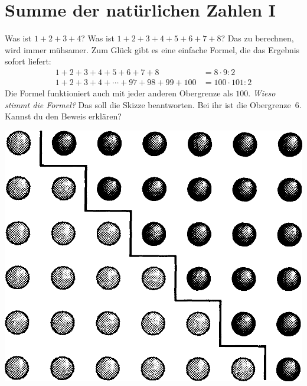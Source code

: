 \documentclass{../zirkelblatt}
\begin{document}
\section*{Summe der natürlichen Zahlen I}
Was ist $1 + 2 + 3 + 4$? Was ist $1 + 2 + 3 + 4 + 5 + 6 + 7 + 8$? Das zu
berechnen, wird immer mühsamer. Zum Glück gibt es eine einfache Formel, die das
Ergebnis sofort liefert:
\begin{align*}
  1 + 2 + 3 + 4 + 5 + 6 + 7 + 8 &= 8 \cdot 9 : 2 \\
  1 + 2 + 3 + 4 + \cdots + 97 + 98 + 99 + 100 &= 100 \cdot 101 : 2
\end{align*}
Die Formel funktioniert auch mit jeder anderen Obergrenze als $100$. \emph{Wieso
stimmt die Formel?} Das soll die Skizze beantworten. Bei ihr ist die
Obergrenze~$6$. Kannst du den Beweis erklären?
\begin{center}
\includegraphics[scale=0.3]{kleiner-gauss-1}
\end{center}
\end{document}
